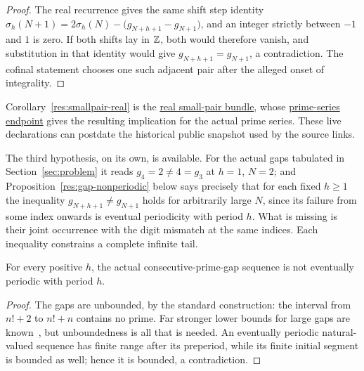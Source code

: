 \documentclass[11pt]{article}
\begin{document}
\begin{proof}
The real recurrence gives the same shift step identity
$\sigma_h(N+1)=2\sigma_h(N)-\bigl(g_{N+h+1}-g_{N+1}\bigr)$, and an integer
strictly between $-1$ and $1$ is zero.  If both shifts lay in $\mathbb{Z}$, both would
therefore vanish, and substitution in that identity would give
$g_{N+h+1}=g_{N+1}$, a contradiction.  The cofinal statement chooses one such
adjacent pair after the alleged onset of integrality.
\end{proof}

\noindent Corollary~\ref{res:smallpair-real} is the
\href{https://github.com/wcook04/plectis-erdos/blob/f36a98bf3d3e6f65f1074e3b800e3293d5b8a51a/ErdosProblems/Erdos251/PaperCoreR7.lean#L282}{real small-pair bundle}, whose
\href{https://github.com/wcook04/plectis-erdos/blob/f36a98bf3d3e6f65f1074e3b800e3293d5b8a51a/ErdosProblems/Erdos251/PaperCoreR7.lean#L298}{prime-series endpoint}
gives the resulting implication for the actual prime series.  These live
declarations can postdate the historical public snapshot used by the source
links.

The third hypothesis, on its own, is available.  For the actual gaps tabulated
in Section~\ref{sec:problem} it reads $g_4=2\ne4=g_3$ at $h=1$, $N=2$; and
Proposition~\ref{res:gap-nonperiodic} below says precisely that for each fixed
$h\ge1$ the inequality $g_{N+h+1}\ne g_{N+1}$ holds for arbitrarily large $N$,
since its failure from some index onwards is eventual periodicity with period
$h$.  What is missing is their joint occurrence with the digit mismatch at the
same indices.  Each inequality constrains a complete infinite tail.

\begin{proposition}\label{res:gap-nonperiodic}
For every positive $h$, the actual consecutive-prime-gap sequence is not
eventually periodic with period $h$.
\end{proposition}

\begin{proof}
The gaps are unbounded, by the standard construction: the interval from $n!+2$
to $n!+n$ contains no prime.  Far stronger lower bounds for large gaps are
known~\cite[Theorem~1, p.~66]{fgkmt2018}, but unboundedness is all that is
needed.  An
eventually periodic natural-valued sequence has finite range after its
preperiod, while its finite initial segment is bounded as well; hence it is
bounded, a contradiction.
\end{proof}
\end{document}
